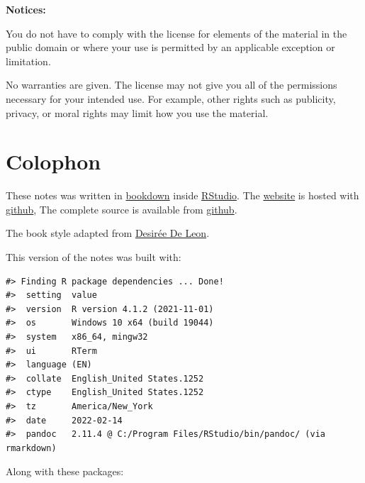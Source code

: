 \textbf{Notices:}

You do not have to comply with the license for elements of the
material in the public domain or where your use is permitted by an
applicable exception or limitation.

No warranties are given. The license may not give you all of the
permissions necessary for your intended use. For example, other rights
such as publicity, privacy, or moral rights may limit how you use the
material.

\hypertarget{colophon}{%
\chapter*{Colophon}\label{colophon}}


These notes was written in \href{http://bookdown.org/}{bookdown} inside \href{http://www.rstudio.com/ide/}{RStudio}. The \href{https://smasongarrison.github.io/syllabi}{website} is hosted with \href{https://www.github.com}{github}, The complete source is available from \href{https://github.com/smasongarrison/syllabi}{github}.

The book style adapted from \href{https://desiree.rbind.io/}{Desirée De Leon}.

This version of the notes was built with:

\begin{verbatim}
#> Finding R package dependencies ... Done!
#>  setting  value
#>  version  R version 4.1.2 (2021-11-01)
#>  os       Windows 10 x64 (build 19044)
#>  system   x86_64, mingw32
#>  ui       RTerm
#>  language (EN)
#>  collate  English_United States.1252
#>  ctype    English_United States.1252
#>  tz       America/New_York
#>  date     2022-02-14
#>  pandoc   2.11.4 @ C:/Program Files/RStudio/bin/pandoc/ (via rmarkdown)
\end{verbatim}

Along with these packages:

